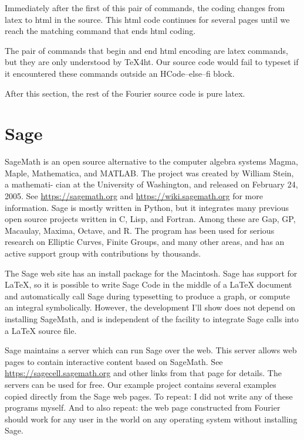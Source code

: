 \documentclass[11pt, oneside]{article}   	%
\begin{document}
Immediately after the first of this pair of commands, the coding changes from latex to html in the source.
This html
code continues for several pages until we reach the matching command that ends html coding.

The pair of commands that begin and end html encoding are latex commands, but they are only
understood by TeX4ht. Our source code would fail to typeset if it encountered these commands
outside an HCode--else--fi block. 

After this section, the rest of the Fourier source code is pure latex.

\section{Sage}

SageMath is an open source alternative to the computer algebra systems Magma, Maple,
Mathematica, and MATLAB. The project was created by William Stein, a mathemati-
cian at the University of Washington, and released on February 24, 2005. See 
\url{https://sagemath.org} and \url{https://wiki.sagemath.org} for more information. Sage is mostly written in Python,
but it integrates many previous open source projects written in C, Lisp, and Fortran.
Among these are Gap, GP, Macaulay, Maxima, Octave, and R. The program has been
used for serious research on Elliptic Curves, Finite Groups, and many other areas, and has
an active support group with contributions by thousands.

The Sage web site has an install package for the Macintosh. Sage has support for LaTeX, so
it is possible to write Sage Code in the middle of a LaTeX document and automatically call
Sage during typesetting to produce a graph, or compute an integral symbolically. However,
the development I’ll show does not depend on installing SageMath, and is independent of
the facility to integrate Sage calls into a LaTeX source file.

Sage maintains a server which can run Sage over the web. This server allows web pages
to contain interactive content based on SageMath. See \url{https://sagecell.sagemath.org}
and other links from that page for details. The servers can be used for free. Our example
project contains several examples copied directly from the Sage web pages. To repeat: I did
not write any of these programs myself. And to also repeat: the web page constructed from
Fourier should work for any user in the world on any operating system without installing
Sage.
\end{document}
